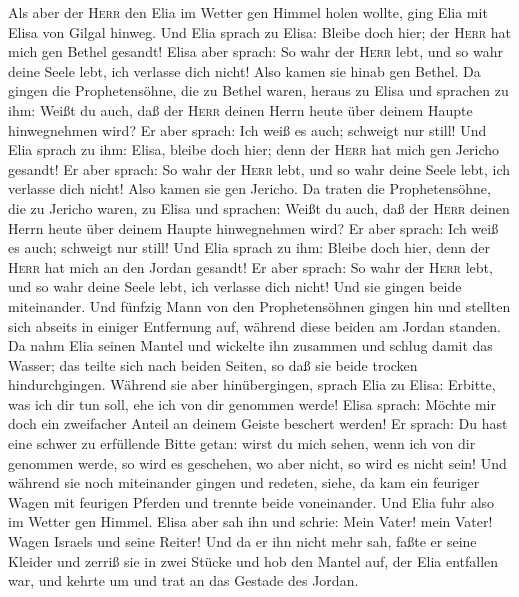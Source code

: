  Als aber der \textsc{Herr} den Elia im Wetter gen Himmel
holen wollte, ging Elia mit Elisa von Gilgal hinweg.  Und
Elia sprach zu Elisa: Bleibe doch hier; der \textsc{Herr} hat mich gen
Bethel gesandt! Elisa aber sprach: So wahr der \textsc{Herr} lebt, und
so wahr deine Seele lebt, ich verlasse dich nicht! Also kamen sie hinab
gen Bethel.  Da gingen die Prophetensöhne, die zu Bethel
waren, heraus zu Elisa und sprachen zu ihm: Weißt du auch, daß der
\textsc{Herr} deinen Herrn heute über deinem Haupte hinwegnehmen wird?
Er aber sprach: Ich weiß es auch; schweigt nur still!  Und
Elia sprach zu ihm: Elisa, bleibe doch hier; denn der \textsc{Herr} hat
mich gen Jericho gesandt! Er aber sprach: So wahr der \textsc{Herr}
lebt, und so wahr deine Seele lebt, ich verlasse dich nicht! Also kamen
sie gen Jericho.  Da traten die Prophetensöhne, die zu
Jericho waren, zu Elisa und sprachen: Weißt du auch, daß der
\textsc{Herr} deinen Herrn heute über deinem Haupte hinwegnehmen wird?
Er aber sprach: Ich weiß es auch; schweigt nur still!  Und
Elia sprach zu ihm: Bleibe doch hier, denn der \textsc{Herr} hat mich an
den Jordan gesandt! Er aber sprach: So wahr der \textsc{Herr} lebt, und
so wahr deine Seele lebt, ich verlasse dich nicht! Und sie gingen beide
miteinander.  Und fünfzig Mann von den Prophetensöhnen
gingen hin und stellten sich abseits in einiger Entfernung auf, während
diese beiden am Jordan standen.  Da nahm Elia seinen
Mantel und wickelte ihn zusammen und schlug damit das Wasser; das teilte
sich nach beiden Seiten, so daß sie beide trocken hindurchgingen.
 Während sie aber hinübergingen, sprach Elia zu Elisa:
Erbitte, was ich dir tun soll, ehe ich von dir genommen werde! Elisa
sprach: Möchte mir doch ein zweifacher Anteil an deinem Geiste beschert
werden!  Er sprach: Du hast eine schwer zu erfüllende
Bitte getan: wirst du mich sehen, wenn ich von dir genommen werde, so
wird es geschehen, wo aber nicht, so wird es nicht sein! 
Und während sie noch miteinander gingen und redeten, siehe, da kam ein
feuriger Wagen mit feurigen Pferden und trennte beide voneinander. Und
Elia fuhr also im Wetter gen Himmel.  Elisa aber sah ihn
und schrie: Mein Vater! mein Vater! Wagen Israels und seine Reiter! Und
da er ihn nicht mehr sah,  faßte er seine Kleider und
zerriß sie in zwei Stücke und hob den Mantel auf, der Elia entfallen
war, und kehrte um und trat an das Gestade des Jordan. 

